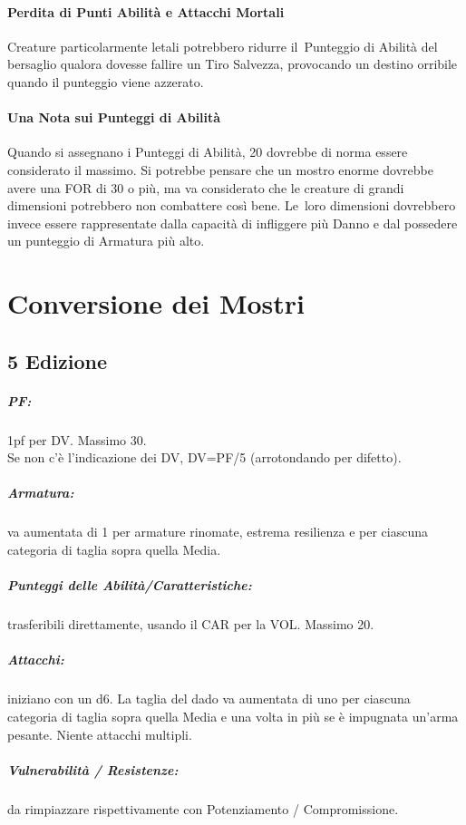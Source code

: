 \documentclass[itdr]{subfiles}
\begin{document}
\vfill
{}

\paragraph{Perdita di Punti Abilità e Attacchi Mortali}
Creature particolarmente letali potrebbero ridurre il~Punteggio di Abilità del bersaglio qualora dovesse fallire un Tiro Salvezza, provocando un destino orribile quando il punteggio viene azzerato.

\vfill
{}
\paragraph{Una Nota sui Punteggi di Abilità}
Quando si assegnano i Punteggi di Abilità, 20 dovrebbe di norma essere considerato il massimo. Si potrebbe pensare che un mostro enorme dovrebbe avere una FOR di 30 o più, ma va considerato che le creature di grandi dimensioni potrebbero non combattere così bene. Le~loro dimensioni dovrebbero invece essere rappresentate dalla capacità di infliggere più Danno e dal possedere un punteggio di Armatura più alto.

\vfill
\break

\section{Conversione dei Mostri}

\subsection*{5 Edizione}

\subparagraph{PF:} 1pf per DV. Massimo 30.\\Se non c'è l'indicazione dei DV, DV=PF/5 (arrotondando per difetto).
\subparagraph{Armatura:} va aumentata di 1 per armature rinomate, estrema resilienza e per ciascuna categoria di taglia sopra quella Media.
\subparagraph{Punteggi delle Abilità/Caratteristiche:} trasferibili direttamente, usando il CAR per la VOL. Massimo 20.
\subparagraph{Attacchi:} iniziano con un d6. La taglia del dado va aumentata di uno per ciascuna categoria di taglia sopra quella Media e una volta in più se è impugnata un'arma pesante. Niente attacchi multipli.
\subparagraph{Vulnerabilità / Resistenze:} da rimpiazzare rispettivamente con Potenziamento / Compromissione.

\vfill
\end{document}
